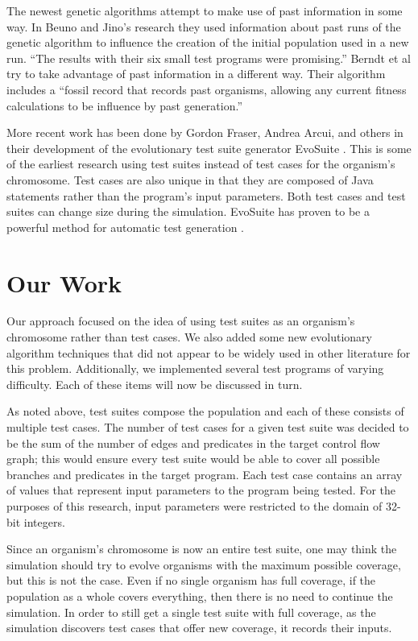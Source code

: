\documentclass[runningheads]{llncs}
\begin{document}
The newest genetic algorithms attempt to make use of past information in some way. In Beuno and Jino's research they used information about past runs of the genetic algorithm to influence the creation of the initial population used in a new run\cite{limits6}. ``The results with their six small test programs were promising.''\cite{limits6} Berndt et al try to take advantage of past information in a different way. Their algorithm includes a ``fossil record that records past organisms, allowing any current fitness calculations to be influence by past generation.''\cite{limits6}

More recent work has been done by Gordon Fraser, Andrea Arcui, and others in their development of the evolutionary test suite generator EvoSuite \cite{FraserTestSuites}. This is some of the earliest research using test suites instead of test cases for the organism's chromosome. Test cases are also unique in that they are composed of Java statements rather than the program's input parameters. Both test cases and test suites can change size during the simulation. EvoSuite has proven to be a powerful method for automatic test generation \cite{Fraser}.

\section{Our Work}
Our approach focused on the idea of using test suites as an organism's chromosome rather than test cases. We also added some new evolutionary algorithm techniques that did not appear to be widely used in other literature for this problem. Additionally, we implemented several test programs of varying difficulty. Each of these items will now be discussed in turn.

As noted above, test suites compose the population and each of these consists of multiple test cases. The number of test cases for a given test suite was decided to be the sum of the number of edges and predicates in the target control flow graph; this would ensure every test suite would be able to cover all possible branches and predicates in the target program. Each test case contains an array of values that represent input parameters to the program being tested. For the purposes of this research, input parameters were restricted to the domain of 32-bit integers.

Since an organism’s chromosome is now an entire test suite, one may think the simulation should try to evolve organisms with the maximum possible coverage, but this is not the case. Even if no single organism has full coverage, if the population as a whole covers everything, then there is no need to continue the simulation. In order to still get a single test suite with full coverage, as the simulation discovers test cases that offer new coverage, it records their inputs. 
\end{document}
